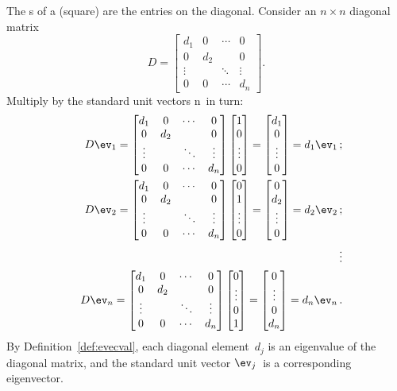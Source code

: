 \begin{example} \label{eg:eigndiag}
The s of a (square)  are the entries on the diagonal.
Consider an \(n\times n\) diagonal matrix
\def\dd{\begin{bmatrix} d_1&0&\cdots&0
\\0&d_2&&0
\\\vdots&&\ddots&\vdots
\\0&0&\cdots&d_n \end{bmatrix}}
\begin{equation*}
D=\dd.
\end{equation*}
Multiply by the standard unit vectors \hlist\ev n\ in turn:
\begin{eqnarray*}
&&D\ev_1
=\dd
\begin{bmatrix} 1\\0\\\vdots\\0 \end{bmatrix}
=\begin{bmatrix} d_1\\0\\\vdots\\0 \end{bmatrix}
=d_1\ev_1\,;
\\&&D\ev_2
=\dd
\begin{bmatrix} 0\\1\\\vdots\\0 \end{bmatrix}
=\begin{bmatrix} 0\\d_2\\\vdots\\0 \end{bmatrix}
=d_2\ev_2\,;
\\&&\vdots
\\&&D\ev_n
=\dd
\begin{bmatrix} 0\\\vdots\\0\\1 \end{bmatrix}
=\begin{bmatrix} 0\\\vdots\\0\\d_n \end{bmatrix}
=d_n\ev_n\,.
\end{eqnarray*}
By Definition~\ref{def:evecval}, each diagonal element~\(d_j\)  is an eigenvalue of the diagonal matrix, and the standard unit vector \(\ev_j\)~is a corresponding eigenvector.
\end{example}


